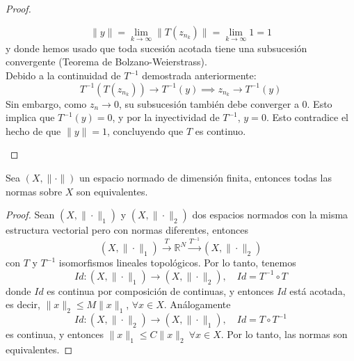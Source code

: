 \begin{prop}
\begin{proof}
\begin{itemize}
        \begin{equation*}
            \|y\| = \lim_{k \to \infty} \|T(z_{n_k})\| = \lim_{k \to \infty} 1 = 1
        \end{equation*}
        y donde hemos usado que toda sucesión acotada tiene una subsucesión convergente (Teorema de Bolzano-Weierstrass). \\

        \noindent
        Debido a la continuidad de $T^{-1}$ demostrada anteriormente:
        \begin{equation*}
            T^{-1}(T(z_{n_k})) \to T^{-1}(y) \implies z_{n_k} \to T^{-1}(y)
        \end{equation*}
        Sin embargo, como $z_n \to 0$, su subsucesión también debe converger a $0$. Esto implica que $T^{-1}(y) = 0$, y por la inyectividad de $T^{-1}$, $y = 0$. Esto contradice el hecho de que $\|y\| = 1$, concluyendo que $T$ es continuo.
    \end{itemize}
\end{proof}
\end{prop}

\begin{coro}
    Sea $(X, \|\cdot\|)$ un espacio normado de dimensión finita, entonces todas las normas sobre $X$ son equivalentes.
    \begin{proof}
    Sean $(X, \|\cdot\|_1)$ y $(X, \|\cdot\|_2)$ dos espacios normados con la misma estructura vectorial pero con normas diferentes, entonces
    \begin{equation*}
        (X, \|\cdot\|_1) \xrightarrow{T} \mathbb{R}^N \xrightarrow{T^{-1}} (X, \|\cdot\|_2)
    \end{equation*}
    con $T$ y $T^{-1}$ isomorfismos lineales topológicos. Por lo tanto, tenemos
    \begin{equation*}
        Id: (X, \|\cdot\|_1) \to (X, \|\cdot\|_2), \quad Id = T^{-1} \circ T
    \end{equation*}
    donde $Id$ es continua por composición de continuas, y entonces $Id$ está acotada, es decir, \mbox{$\|x\|_2\leq M\|x\|_1$}, $\forall x\in X$. Análogamente 
    \begin{equation*}
        Id: (X, \|\cdot\|_2) \to (X, \|\cdot\|_1), \quad Id = T \circ T^{-1}
    \end{equation*}
    es continua, y entonces $\|x\|_1 \leq C \|x\|_2 \ \forall x\in X$. Por lo tanto, las normas son equivalentes.
    
\end{proof}
\end{coro}



